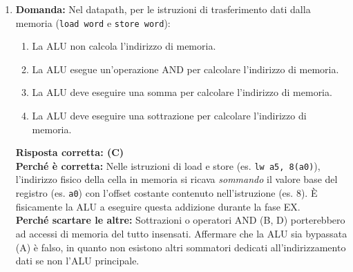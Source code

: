\documentclass[12pt, a4paper]{article}
\begin{document}
\begin{enumerate}
    \item \textbf{Domanda:} Nel datapath, per le istruzioni di trasferimento dati dalla memoria (\texttt{load word} e \texttt{store word}):
    \begin{enumerate}[label=(\Alph*)]
        \item La ALU non calcola l'indirizzo di memoria.
        \item La ALU esegue un'operazione AND per calcolare l'indirizzo di memoria.
        \item La ALU deve eseguire una somma per calcolare l'indirizzo di memoria.
        \item La ALU deve eseguire una sottrazione per calcolare l'indirizzo di memoria.
    \end{enumerate}

\newpage

    \textbf{Risposta corretta: (C)} \\
    \textbf{Perché è corretta:} Nelle istruzioni di load e store (es. \texttt{lw a5, 8(a0)}), l'indirizzo fisico della cella in memoria si ricava \textit{sommando} il valore base del registro (es. \texttt{a0}) con l'offset costante contenuto nell'istruzione (es. 8). È fisicamente la ALU a eseguire questa addizione durante la fase EX. \\
    \textbf{Perché scartare le altre:} Sottrazioni o operatori AND (B, D) porterebbero ad accessi di memoria del tutto insensati. Affermare che la ALU sia bypassata (A) è falso, in quanto non esistono altri sommatori dedicati all'indirizzamento dati se non l'ALU principale.


\end{enumerate}
\end{document}
